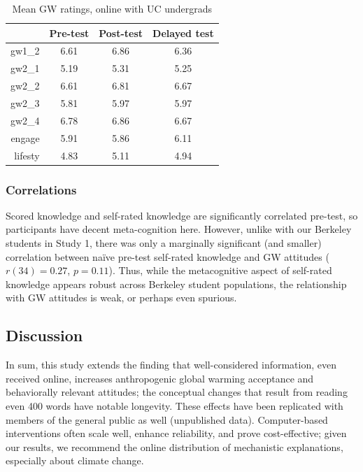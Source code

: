 \begin{table}[h]
\caption{Mean GW ratings, online with UC undergrads} 
\label{table:uc-online-gw-means}
\centering
\begin{tabular}{>{\sffamily}rccc}
  \toprule
 & Pre-test & Post-test & Delayed test \\ 
  \midrule
  gw1\_2 & 6.61 & 6.86 & 6.36 \\ 
  gw2\_1 & 5.19 & 5.31 & 5.25 \\ 
  gw2\_2 & 6.61 & 6.81 & 6.67 \\ 
  gw2\_3 & 5.81 & 5.97 & 5.97 \\ 
  gw2\_4 & 6.78 & 6.86 & 6.67 \\ 
  engage & 5.91 & 5.86 & 6.11 \\ 
  lifesty & 4.83 & 5.11 & 4.94 \\ 
  \bottomrule
\end{tabular}
\end{table}



\subsubsection{Correlations}

Scored knowledge and self-rated knowledge are significantly correlated pre-test,
so participants have decent meta-cognition here.
However, unlike with our Berkeley students in Study 1, there was only a
marginally significant (and smaller) correlation between na\"ive pre-test
self-rated knowledge and GW attitudes ($r(34)=0.27$, $p=0.11$). Thus, while the
metacognitive aspect of self-rated knowledge appears robust across Berkeley
student populations, the relationship with GW attitudes is weak, or perhaps even
spurious.



\subsection{Discussion}

In sum, this study extends the finding that well-considered information, even
received online, increases anthropogenic global warming acceptance and
behaviorally relevant attitudes; the conceptual changes that result from reading
even 400 words have notable longevity. These effects have been replicated with
members of the general public as well (unpublished data). Computer-based
interventions often scale well, enhance reliability, and prove cost-effective;
given our results, we recommend the online distribution of mechanistic
explanations, especially about climate change.  

